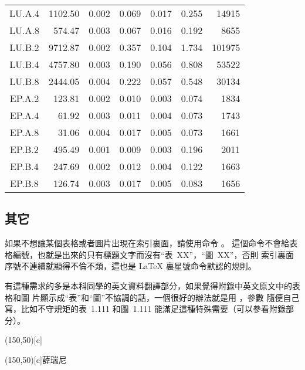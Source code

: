 \begin{longtable}[c]{c*{6}{r}}
LU.A.4 & 1102.50 & 0.002 & 0.069 & 0.017 & 0.255 & 14915 \\
LU.A.8 & 574.47 & 0.003 & 0.067 & 0.016 & 0.192 & 8655 \\
LU.B.2 & 9712.87 & 0.002 & 0.357 & 0.104 & 1.734 & 101975 \\
LU.B.4 & 4757.80 & 0.003 & 0.190 & 0.056 & 0.808 & 53522 \\
LU.B.8 & 2444.05 & 0.004 & 0.222 & 0.057 & 0.548 & 30134 \\
EP.A.2 & 123.81 & 0.002 & 0.010 & 0.003 & 0.074 & 1834 \\
EP.A.4 & 61.92 & 0.003 & 0.011 & 0.004 & 0.073 & 1743 \\
EP.A.8 & 31.06 & 0.004 & 0.017 & 0.005 & 0.073 & 1661 \\
EP.B.2 & 495.49 & 0.001 & 0.009 & 0.003 & 0.196 & 2011 \\
EP.B.4 & 247.69 & 0.002 & 0.012 & 0.004 & 0.122 & 1663 \\
EP.B.8 & 126.74 & 0.003 & 0.017 & 0.005 & 0.083 & 1656 \\
\bottomrule[1.5pt]
\end{longtable}

\subsection{其它}
\label{sec:tableother}
如果不想讓某個表格或者圖片出現在索引裏面，請使用命令 。
這個命令不會給表格編號，也就是出來的只有標題文字而沒有“表~XX”，“圖~XX”，否則
索引裏面序號不連續就顯得不倫不類，這也是 \LaTeX{} 裏星號命令默認的規則。

有這種需求的多是本科同學的英文資料翻譯部分，如果覺得附錄中英文原文中的表格和圖
片顯示成“表”和“圖”不協調的話，一個很好的辦法就是用 ，參數
隨便自己寫，比如不守規矩的表~1.111 和圖~1.111 能滿足這種特殊需要（可以參看附錄部
分）。
\begin{table}[ht]
  \begin{minipage}{0.4\linewidth}
    \centering
    \caption*{表~1.111\quad 這是一個手動編號，不出現在索引中的表格。}
    \label{tab:badtabular}
      \framebox(150,50)[c]{\thuthesis}
  \end{minipage}%
  \hfill%
  \begin{minipage}{0.4\linewidth}
    \centering
    \caption*{Figure~1.111\quad 這是一個手動編號，不出現在索引中的圖。}
    \label{tab:badfigure}
    \framebox(150,50)[c]{薛瑞尼}
  \end{minipage}
\end{table}


